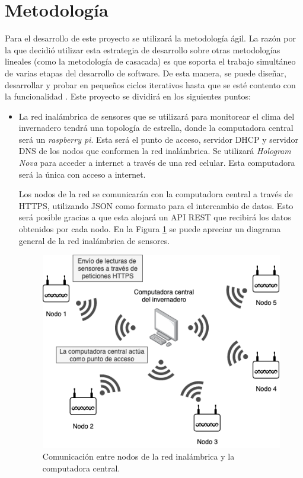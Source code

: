 \section{Metodología}

Para el desarrollo de este proyecto se utilizará la metodología ágil. La razón por la que decidió utilizar esta estrategia de desarrollo sobre otras metodologías lineales (como la metodología de casacada) es que soporta el trabajo simultáneo de varias etapas del desarrollo de software. De esta manera, se puede diseñar, desarrollar y probar en pequeños ciclos iterativos hasta que se esté contento con la funcionalidad \cite{what_is_agile_meth}. Este proyecto se dividirá en los siguientes puntos:

\begin{itemize}
	
	\item La red inalámbrica de sensores que se utilizará para monitorear el clima del invernadero tendrá una topología de estrella, donde la computadora central será un \textit{raspberry pi}. Esta será el punto de acceso, servidor DHCP y servidor DNS de los nodos que conformen la red inalámbrica. Se utilizará \textit{Hologram Nova} para acceder a internet a través de una red celular. Esta computadora será la única con acceso a internet.

	Los nodos de la red se comunicarán con la computadora central a través de HTTPS, utilizando JSON como formato para el intercambio de datos. Esto será posible gracias a que esta alojará un API REST que recibirá los datos obtenidos por cada nodo. En la Figura \ref{fig:coms_nodos_raspberry} se puede apreciar un diagrama general de la red inalámbrica de sensores.

	\begin{figure}[!ht]
		\centering
		\includegraphics[width=.60\linewidth]{imagenes/diagramas/comunicacion_nodos_raspberry.png}
		\caption{Comunicación entre nodos de la red inalámbrica y la computadora central.}
		\label{fig:coms_nodos_raspberry}
	\end{figure}


\end{itemize}
